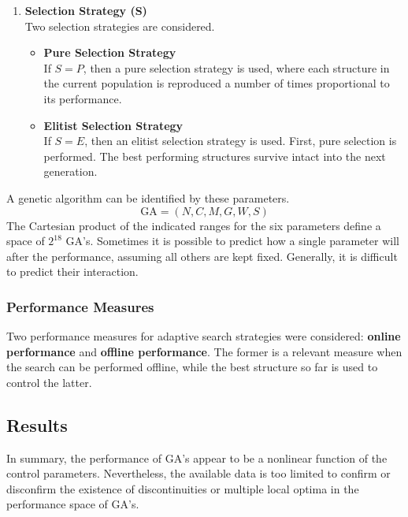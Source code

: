 \documentclass[../main.tex]{subfiles}
\begin{document}
\begin{enumerate}
	\item \textbf{Selection Strategy (S)} \\
	Two selection strategies are considered.
	\begin{itemize}
		\item \textbf{Pure Selection Strategy} \\
		If $S = P$, then a pure selection strategy is used, where each structure in the current population is
		reproduced a number of times proportional to its performance.
		\item \textbf{Elitist Selection Strategy} \\
		If $S = E$, then an elitist selection strategy is used. First, pure selection is performed. The best performing
		structures survive intact into the next generation.
	\end{itemize}
\end{enumerate}
A genetic algorithm can be identified by these parameters.
\[
\text{GA} = (N,C,M,G,W,S)
\]
The Cartesian product of the indicated ranges for the six parameters define a space of $2^{18}$ GA's. Sometimes it is
possible to predict how a single parameter will after the performance, assuming all others are kept fixed. Generally,
it is difficult to predict their interaction.

\subsubsection{Performance Measures}

Two performance measures for adaptive search strategies were considered: \textbf{online performance} and
\textbf{offline performance}. The former is a relevant measure when the search can be performed offline, while the best
structure so far is used to control the latter.

\subsection{Results}
In summary, the performance of GA's appear to be a nonlinear function of the control parameters. Nevertheless, the
available data is too limited to confirm or disconfirm the existence of discontinuities or multiple local optima in the
performance space of GA's.
\end{document}
